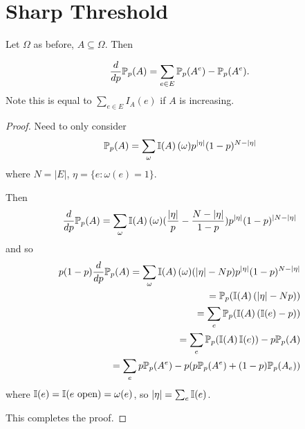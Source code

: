 \section{Sharp Threshold}
\label{sec:sharp-threshold}

Let $\Omega$ as before, $A \subseteq \Omega$.  Then
\begin{thm}
  \label{defn:random_walks_on_graphs:24}
  \begin{align}
    \label{eq:31}
    \frac{d}{dp} \Prob_{p}(A) = \sum_{e \in E} \Prob_{p}(A^{e}) - \Prob_{p}(A^{e}).
  \end{align}
  Note this is equal to $\sum_{e \in E} I_{A}(e)$ if $A$ is increasing.
\end{thm}

\begin{proof}
  Need to only consider
  \begin{align}
    \label{eq:32}
    \Prob_{p}(A) = \sum_{\omega} \I{A}(\omega) p^{|\eta|}(1-p)^{N - |\eta|}
  \end{align} where $N = |E|$, $\eta = \{ e: \omega(e)= 1 \}$.

  Then
  \begin{align}
    \label{eq:33}
    \frac{d}{dp}\Prob_{p}(A) = \sum_{\omega} \I{A}(\omega)
    (\frac{|\eta|}{p} - \frac{N - |\eta|}{1 - p}) p^{|\eta|}(1-p)^{|N
      - |\eta|}
  \end{align}
  and so
  \begin{align}
    \label{eq:34}
    p(1-p) \frac{d}{dp}\Prob_{p}(A) = \sum_{\omega}
    \I{A}(\omega)(|\eta| - Np) p^{|\eta|}(1-p)^{N - |\eta|} \\
    = \Prob_{p}(\I{A}(|\eta| - Np)) \\
    = \sum_{e} \Prob_{p}(\I{A}(\I{e} - p)) \\
    = \sum_{e} \Prob_{p}(\I{A}\I{e}) - p \Prob_{p}(A) \\
    = \sum_{e} p \Prob_{p}(A^{e}) - p(p \Prob_{p}(A^{e}) + (1-p) \Prob_{p}(A_{e}))
  \end{align} where $\I{e} = \I{\text{$e$ open}} = \omega(e)$, so
  $|\eta| = \sum_{e} \I{e}$.

  This completes the proof.
\end{proof}

